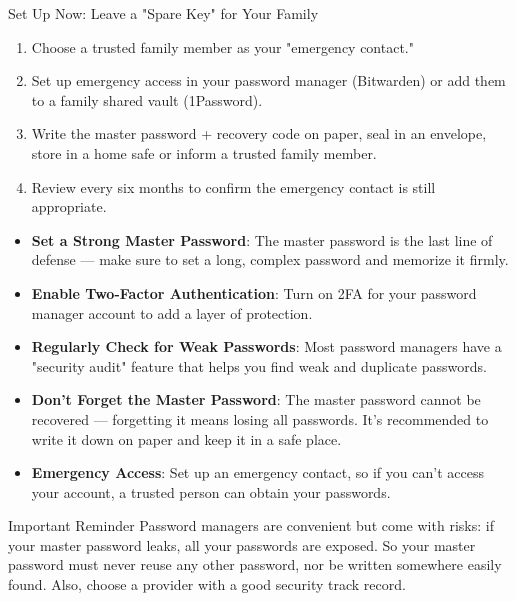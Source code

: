 \begin{tcbpractice}{Set Up Now: Leave a "Spare Key" for Your Family}
\begin{enumerate}
  \item Choose a trusted family member as your "emergency contact."
  \item Set up emergency access in your password manager (Bitwarden) or add them to a family shared vault (1Password).
  \item Write the master password + recovery code on paper, seal in an envelope, store in a home safe or inform a trusted family member.
  \item Review every six months to confirm the emergency contact is still appropriate.
\end{enumerate}

\end{tcbpractice}


\begin{itemize}
  \item \textbf{Set a Strong Master Password}: The master password is the last line of defense — make sure to set a long, complex password and memorize it firmly.
  \item \textbf{Enable Two-Factor Authentication}: Turn on 2FA for your password manager account to add a layer of protection.
  \item \textbf{Regularly Check for Weak Passwords}: Most password managers have a "security audit" feature that helps you find weak and duplicate passwords.
  \item \textbf{Don't Forget the Master Password}: The master password cannot be recovered — forgetting it means losing all passwords. It's recommended to write it down on paper and keep it in a safe place.
  \item \textbf{Emergency Access}: Set up an emergency contact, so if you can't access your account, a trusted person can obtain your passwords.
\end{itemize}

\begin{tcbwarn}{Important Reminder}
Password managers are convenient but come with risks: if your master password leaks, all your passwords are exposed. So your master password must never reuse any other password, nor be written somewhere easily found. Also, choose a provider with a good security track record.

\end{tcbwarn}

